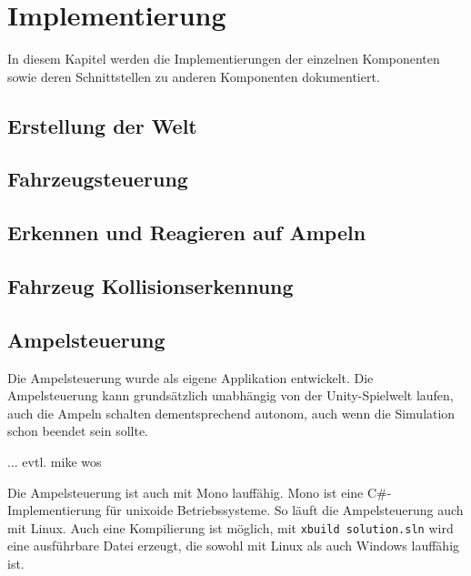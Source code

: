
\chapter{Implementierung}
\label{Implementierung}

In diesem Kapitel werden die Implementierungen der einzelnen Komponenten sowie deren Schnittstellen zu anderen Komponenten dokumentiert.

\thispagestyle{standard}
\pagestyle{standard}

\section{Erstellung der Welt}
\label{Erstellung der Welt}

\section{Fahrzeugsteuerung}
\label{Fahrzeugsteuerung}

\section{Erkennen und Reagieren auf Ampeln}
\label{Erkennen und Reagieren auf Ampeln}

\section{Fahrzeug Kollisionserkennung}
\label{Fahrzeug Kollisionserkennung}


\section{Ampelsteuerung}
\label{Ampelsteuerung}

Die Ampelsteuerung wurde als eigene Applikation entwickelt. Die Ampelsteuerung kann grundsätzlich unabhängig von der Unity-Spielwelt laufen, auch die Ampeln schalten dementsprechend autonom, auch wenn die Simulation schon beendet sein sollte.

... evtl. mike wos


Die Ampelsteuerung ist auch mit Mono lauffähig. Mono ist eine C\#-Implementierung für unixoide Betriebssysteme. So läuft die Ampelsteuerung auch mit Linux. Auch eine Kompilierung ist möglich, mit \texttt{xbuild solution.sln} wird eine ausführbare Datei erzeugt, die sowohl mit Linux als auch Windows lauffähig ist.

